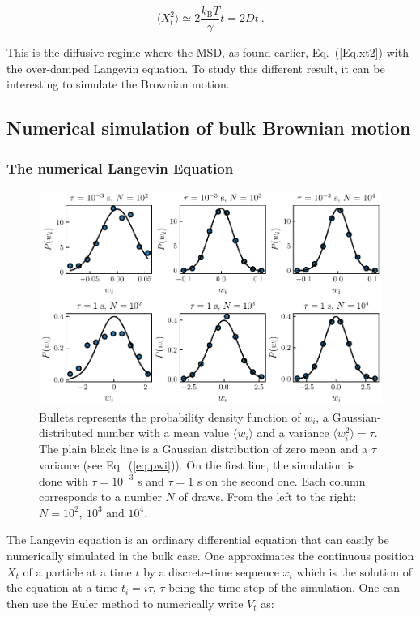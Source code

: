 \begin{equation}
	\langle X_t ^2 \rangle \simeq 2 \frac{k_\mathrm{B}T}{\gamma} t = 2Dt ~.
	\label{eq:longtimemsd}
\end{equation}

This is the diffusive regime where the \gls{MSD}, as found earlier, Eq.~(\ref{Eq.xt2}) with the over-damped Langevin equation. To study this different result, it can be interesting to simulate the Brownian motion.

\subsection{Numerical simulation of bulk Brownian motion}

\subsubsection{The numerical Langevin Equation}

\begin{figure}[!hb]
	\centering
	\includegraphics{02_body/chapter1/image/noise_simulation/exemple.pdf}
	\caption{Bullets represents the probability density function of $w_i$, a Gaussian-distributed number with a mean value $\langle w_i \rangle$ and a variance $\langle w_i ^2 \rangle  = \tau$. The plain black line is a Gaussian distribution of zero mean and a $\tau$ variance (see Eq.~(\ref{eq.pwi})). On the first line, the simulation is done with $\tau = 10^{-3}$ s and $\tau = 1$ s on the second one. Each column corresponds to a number $N$ of draws. From the left to the right: $N=10^2, ~10^3 \text{ and } 10^4$. }
	\label{fig:exempleprecisionwi}
\end{figure}


The Langevin equation is an ordinary differential equation that can easily be numerically simulated in the bulk case. One approximates the continuous position $X_t$ of a particle at a time $t$ by a discrete-time sequence $x_i$ which is the solution of the equation at a time $t_i = i  \tau$, $\tau$ being the time step of the simulation. One can then use the Euler method to numerically write $V_t$ as:

